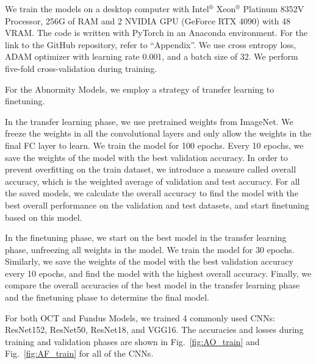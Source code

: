 \documentclass{article}
\begin{document}
	We train the models on a desktop computer with Intel$^®$ Xeon$^®$ Platinum 8352V Processor, 256G of RAM and 2 NVIDIA GPU (GeForce RTX 4090) with 48 VRAM. The code is written with PyTorch in an Anaconda environment. For the link to the GitHub repository, refer to ``Appendix''. We use cross entropy loss, ADAM optimizer with learning rate 0.001, and a batch size of 32. We perform five-fold cross-validation during training. 
	
	For the Abnormity Models, we employ a strategy of transfer learning to finetuning. 
	
	In the transfer learning phase, we use pretrained weights from ImageNet. We freeze the weights in all the convolutional layers and only allow the weights in the final FC layer to learn. We train the model for 100 epochs. Every 10 epochs, we save the weights of the model with the best validation accuracy. In order to prevent overfitting on the train dataset, we introduce a measure called overall accuracy, which is the weighted average of validation and test accuracy. For all the saved models, we calculate the overall accuracy to find the model with the best overall performance on the validation and test datasets, and start finetuning based on this model. 
	
	In the finetuning phase, we start on the best model in the transfer learning phase, unfreezing all weights in the model. We train the model for 30 epochs. Similarly, we save the weights of the model with the best validation accuracy every 10 epochs, and find the model with the highest overall accuracy. Finally, we compare the overall accuracies of the best model in the transfer learning phase and the finetuning phase to determine the final model. 
	
	For both OCT and Fundus Models, we trained 4 commonly used CNNs: ResNet152, ResNet50, ResNet18, and VGG16. The accuracies and losses during training and validation phases are shown in Fig.~\ref{fig:AO_train} and Fig.~\ref{fig:AF_train} for all of the CNNs. 
	
\end{document}
